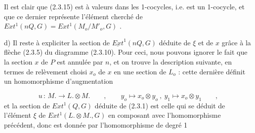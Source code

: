 
Il est clair que (2.3.15) est à valeurs dans les 1-cocycles, i.e. est un 1-cocycle, et que ce dernier représente l'élément cherché de $Ext^1(nQ,G) = Ext^1(M_o/M'_o,G)$ .

d) Il reste à expliciter la section de $\underline{Ext}^1(nQ,G)$ déduite de $\xi$ et de $x$ grâce à la flèche (2.3.5) du diagramme (2.3.10). Pour ceci, nous pouvons ignorer le fait que la section $x$ de $P$ est annulée par $n$, et on trouve la description suivante, en termes de relèvement choisi $x_o$ de $x$ en une section de $L_o$ : cette dernière définit un homomorphisme d'augmentation

\begin{equation*}
u \, : \, M. \longrightarrow L. \otimes M. \qquad , \qquad y_o \mapsto x_o \otimes y_o \ , \ y_1 \mapsto x_o \otimes y_1 \qquad ,
\end{equation*}
et la section de $Ext^1(Q,G)$ déduite de (2.3.1) est celle qui se déduit de l'élément $\xi$ de $Ext^1(L. \otimes M.,G)$ en composant avec l'homomorphisme précédent, donc est donnée par l'homomorphisme de degré 1

